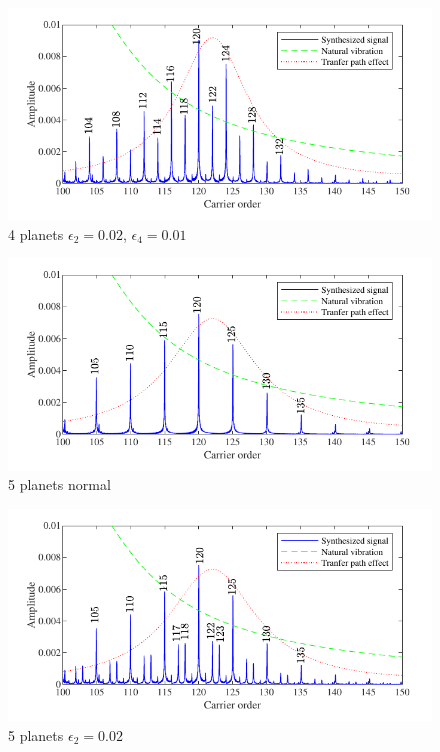 \documentclass[a4paper,fleqn]{cas-sc}%
\begin{document}
\begin{figure}[pos=htbp]
    \centering
    \includegraphics[scale=1]{Figures/4_planet_2-th-0_02_4_th_0_01_fourier.pdf}
    \caption{4 planets $\epsilon_2=0.02$\degree, $\epsilon_4=0.01$\degree}
    \label{fig:4_planet_2-th-0_02_4_th_0_01_fourier}
\end{figure}
\begin{figure}[pos=htbp]
    \centering
    \includegraphics[scale=1]{Figures/5_planet_normal_fourier.pdf}
    \caption{5 planets normal}
    \label{fig:5_planet_normal_fourier}
\end{figure}
\begin{figure}[pos=htbp]
    \centering
    \includegraphics[scale=1]{Figures/5_planet_2_th_0_02_fourier.pdf}
    \caption{5 planets $\epsilon_2=0.02$\degree}
    \label{fig:5_planet_2_th_0_02_fourier}
\end{figure}
\end{document}
